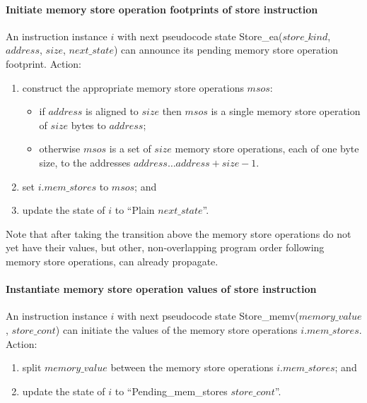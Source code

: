 \paragraph{Initiate memory store operation footprints of store instruction}\label{omm:thread:announce_mem_write_footprint}
An instruction instance $i$ with next pseudocode state {\sc Store\_ea}($store\_kind$, $address$, $size$, $next\_state$) can announce its pending memory store operation footprint.
Action:
\begin{enumerate}
\item construct the appropriate memory store operations $msos$:
  \begin{itemize}
  \item if $address$ is aligned to $size$ then $msos$ is a single memory store operation of $size$ bytes to $address$;
  \item otherwise $msos$ is a set of $size$ memory store operations, each of one byte size, to the addresses $address\ldots address+size-1$.
  \end{itemize}
\item set $i.mem\_stores$ to $msos$; and
\item update the state of $i$ to ``{\sc Plain} $next\_state$''.
\end{enumerate}

\begin{commentary}
Note that after taking the transition above the memory store operations do not yet have their values, but other, non-overlapping program order following memory store operations, can already propagate.
\end{commentary}


\paragraph{Instantiate memory store operation values of store instruction}\label{omm:thread:initiate_mem_write}
An instruction instance $i$ with next pseudocode state {\sc Store\_memv}($memory\_value$, $store\_cont$) can initiate the values of the memory store operations $i.mem\_stores$.
Action:
\begin{enumerate}
\item split $memory\_value$ between the memory store operations $i.mem\_stores$; and
\item update the state of $i$ to ``{\sc Pending\_mem\_stores} $store\_cont$''.
\end{enumerate}


